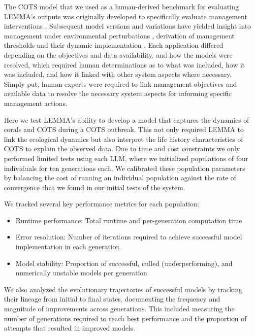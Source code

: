 The COTS model that we used as a human-derived benchmark for evaluating LEMMA's outputs was originally developed to specifically evaluate management interventions \citep{morello2014model}. Subsequent model versions and variations have yielded insight into management under environmental perturbations \citep{Rogers_Plaganyi_2022,Condie_Anthony_Babcock_Baird_Beeden_Fletcher_Gorton_Harrison_Hobday_Plaganyi_et_al_2021}, derivation of management thresholds \citep{plaganyi2020ecological,rogers2024validating} and their dynamic implementation \citep{rogers2023improving}. Each application differed depending on the objectives and data availability, and how the models were resolved, which required human determinations as to what was included, how it was included, and how it linked with other system aspects where necessary. Simply put, human experts were required to link management objectives and available data to resolve the necessary system aspects for informing specific management actions. 

Here we test LEMMA's ability to develop a model that captures the dynamics of corals and COTS during a COTS outbreak. This not only required LEMMA to link the ecological dynamics but also interpret the life history characteristics of COTS to explain the observed data. Due to time and cost constraints we only performed limited tests using each LLM, where we initialized populations of four individuals for ten generations each. We calibrated these population parameters by balancing the cost of running an individual population against the rate of convergence that we found in our initial tests of the system.

We tracked several key performance metrics for each population:
\begin{itemize}
    \item Runtime performance: Total runtime and per-generation computation time
    \item Error resolution: Number of iterations required to achieve successful model implementation in each generation
    \item Model stability: Proportion of successful, culled (underperforming), and numerically unstable models per generation
\end{itemize}

We also analyzed the evolutionary trajectories of successful models by tracking their lineage from initial to final states, documenting the frequency and magnitude of improvements across generations. This included measuring the number of generations required to reach best performance and the proportion of attempts that resulted in improved models.

